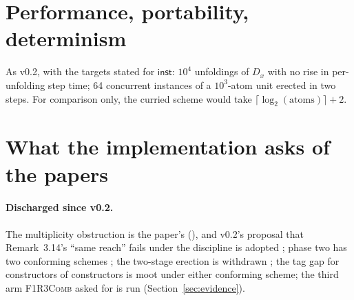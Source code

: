 \documentclass[11pt,a4paper]{article}
\newcommand{\Comb}{\textsc{F1R3Comb}}
\theoremstyle{definition}
\theoremstyle{plain}
\newcommand{\inst}{\mathsf{inst}}
\begin{document}
\section{Performance, portability, determinism}\label{sec:perf}

As v0.2, with the targets stated for $\inst$: $10^{4}$ unfoldings of $D_{x}$
with no rise in per-unfolding step time; 64 concurrent instances of a
$10^{3}$-atom unit erected in two steps. For comparison only, the curried
scheme would take $\lceil\log_{2}(\text{atoms})\rceil + 2$.

\section{What the implementation asks of the papers}\label{sec:paper}

\paragraph{Discharged since v0.2.} The multiplicity obstruction is the
paper's (\cite[Prop.~6.17, Lem.~6.19]{draft3}), and v0.2's proposal that
Remark~3.14's ``same reach'' fails under the discipline is adopted
\cite[Rem.~3.14]{draft3}; phase two has two conforming schemes
\cite[\S6.7]{draft3}; the two-stage erection is withdrawn
\cite[Rem.~5.16]{combspec}; the tag gap for constructors of constructors is
moot under either conforming scheme; the third arm \Comb{} asked for is run
(Section~\ref{sec:evidence}).
\end{document}
